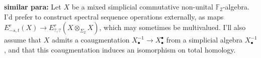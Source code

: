 \documentclass[11pt]{amsart}
\theoremstyle{plain}
\theoremstyle{definition}
\let\phi\varphi
\renewcommand{\to}{\longrightarrow}
\theoremstyle{plain}
\newcommand{\Nabla}{\nabla}
\newcommand{\F}{\mathbb{F}}
\newcommand{\Ftwo}{\F_2}
\begin{document}
\begin{second quadrant homotopy}
\begin{shaded}
\textbf{similar para:} Let $X$ be a mixed simplicial commutative non-unital $\Ftwo $-algebra. I'd prefer to construct spectral sequence operations externally, as maps $E^r_{-s,t}(X)\to E^r_{?,?}(X\otimes_{\Sigma_2}X)$, which may sometimes be multivalued. I'll also assume that $X$ admits a coaugmentation $X^{-1}_\bullet\to X^\bullet_\bullet$ from a simplicial algebra $X^{-1}_\bullet$, and that this coaugmentation induces an isomorphism on total homology.
%


\end{shaded}
\end{second quadrant homotopy}
\end{document}
